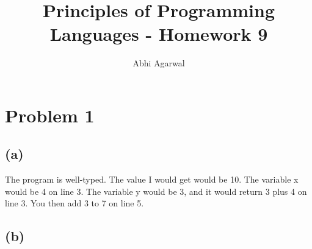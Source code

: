 \documentclass[11pt, oneside]{article}
\title{Principles of Programming Languages - Homework 9}
\author{Abhi Agarwal}
\date{}
\begin{document}
\maketitle
\section{Problem 1}
\subsection*{(a)} The program is well-typed. The value I would get would be 10. The variable x would be 4 on line 3. The variable y would be 3, and it would return 3 plus 4 on line 3. You then add 3 to 7 on line 5.
\subsection*{(b)} 
\end{document}

